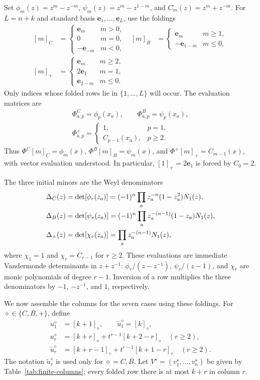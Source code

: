 \documentclass[12pt]{article}
\numberwithin{equation}{section}
\newcommand{\ph}{\phi}
\newcommand{\ps}{\psi}
\newcommand{\eb}{\mathbf e}
\begin{document}
Set $\ph_m(z)=z^m-z^{-m}$, $\ps_m(z)=z^m-z^{1-m}$, and
$C_m(z)=z^m+z^{-m}$.
For $L=n+k$ and standard basis $\eb_1,\ldots,\eb_L$, use the foldings
\[
\begin{aligned}
 [m]_C&=\begin{cases}\eb_m&m>0,\\0&m=0,\\-\eb_{-m}&m<0,\end{cases}
 & [m]_B&=\begin{cases}\eb_m&m\ge1,\\-\eb_{1-m}&m\le0,\end{cases}\\
 [m]_+&=\begin{cases}\eb_m&m\ge2,\\2\eb_1&m=1,\\\eb_{2-m}&m\le0.\end{cases}
\end{aligned}
\]
Only indices whose folded rows lie in $\{1,\ldots,L\}$ will occur.
The evaluation matrices are
\[
\begin{gathered}
 \Phi^C_{a,p}=\ph_p(x_a),\qquad \Phi^B_{a,p}=\ps_p(x_a),\\[2pt]
 \Phi^+_{a,p}=\begin{cases}
 1,&p=1,\\
 C_{p-1}(x_a),&p\ge2.
 \end{cases}
\end{gathered}
\]
Thus $\Phi^C[m]_C=\ph_m(x)$, $\Phi^B[m]_B=\ps_m(x)$,
and $\Phi^+[m]_+=C_{m-1}(x)$, with vector evaluation understood.
In particular, $[1]_+=2\eb_1$ is forced by $C_0=2$.

The three initial minors are the Weyl denominators
\begin{align}
 \Delta_C(z)&=\det[\ph_r(z_a)]
 =(-1)^n\prod_a z_a^{-n}(1-z_a^2)N_1(z),\notag\\
 \Delta_B(z)&=\det[\ps_r(z_a)]
 =(-1)^n\prod_a z_a^{-(n-1)}(1-z_a)N_1(z),\label{eq:denominators}\\
 \Delta_+(z)&=\det[\chi_r(z_a)]
 =\prod_a z_a^{-(n-1)}N_1(z),\notag
\end{align}
where $\chi_1=1$ and $\chi_r=C_{r-1}$ for $r\ge2$.
These evaluations are immediate Vandermonde determinants in $z+z^{-1}$:
$\ph_r/(z-z^{-1})$, $\ps_r/(z-1)$, and $\chi_r$ are monic
polynomials of degree $r-1$.  Inversion of a row multiplies the three
denominators by $-1$, $-z^{-1}$, and $1$, respectively.

We now assemble the columns for the seven cases using these foldings.
For $\diamond\in\{C,B,+\}$, define
\[
\begin{aligned}
 u_1^\diamond&=[k+1]_\diamond,\qquad
 \widetilde u_1^\diamond=[k]_\diamond,\\
 u_r^\diamond&=[k+r]_\diamond+t^{r-1}[k+2-r]_\diamond
 \quad(r\ge2),\\
 \widetilde u_r^\diamond&=[k+r-1]_\diamond+t^{r-1}[k+1-r]_\diamond
 \quad(r\ge2).
\end{aligned}
\]
The notation $\widetilde u_r^\diamond$ is used only for $\diamond=C,B$.
Let $V^\star=(v_1^\star,\ldots,v_n^\star)$ be given by
Table~\ref{tab:finite-columns}; every folded row there is at most $k+r$
in column $r$.
\end{document}
